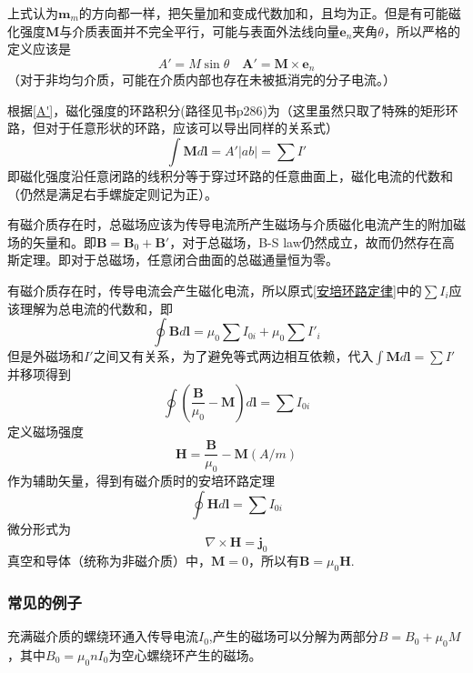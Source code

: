 上式认为$\bm{m}_m$的方向都一样，把矢量加和变成代数加和，且均为正。但是有可能磁化强度$\bm{M}$与介质表面并不完全平行，可能与表面外法线向量$\bm{e}_n$夹角$\theta$，所以严格的定义应该是
\begin{equation}
    A'=M\sin \theta \quad \bm{A}'=\bm{M}\times \bm{e}_n
\end{equation}
（对于非均匀介质，可能在介质内部也存在未被抵消完的分子电流。）

根据\ref{A'}，磁化强度的环路积分(路径见书p286)为（这里虽然只取了特殊的矩形环路，但对于任意形状的环路，应该可以导出同样的关系式）
\begin{equation}
    \int \bm{M}d\bm{l}=A'|ab|=\sum I'
\end{equation}
即磁化强度沿任意闭路的线积分等于穿过环路的任意曲面上，磁化电流的代数和（仍然是满足右手螺旋定则记为正）。

有磁介质存在时，总磁场应该为传导电流所产生磁场与介质磁化电流产生的附加磁场的矢量和。即$\bm{B}=\bm{B}_0+\bm{B}'$，对于总磁场，B-S law仍然成立，故而仍然存在高斯定理。即对于总磁场，任意闭合曲面的总磁通量恒为零。

有磁介质存在时，传导电流会产生磁化电流，所以原式\ref{安培环路定律}中的$\sum I_i$应该理解为总电流的代数和，即
\begin{equation}
    \oint \bm{B}d\bm{l}=\mu_0\sum I_{0i}+\mu_0\sum I'_i
\end{equation}
但是外磁场和$I'$之间又有关系，为了避免等式两边相互依赖，代入$\int \bm{M}d\bm{l}=\sum I'$并移项得到
\begin{equation}
    \oint (\dfrac{\bm{B}}{\mu_0}-\bm{M})d\bm{l}=\sum I_{0i}
\end{equation}
定义磁场强度
\begin{equation}
    \bm{H}=\dfrac{\bm{B}}{\mu_0}-\bm{M}(A/m)
\end{equation}
作为辅助矢量，得到有磁介质时的安培环路定理
\begin{equation}
    \oint \bm{H}d\bm{l}=\sum I_{0i}
\end{equation}
微分形式为
\begin{equation}
    \nabla \times \bm{H}=\bm{j}_0
\end{equation}
真空和导体（统称为非磁介质）中，$\bm{M}=0$，所以有$\bm{B}=\mu_0\bm{H}$.
\subsubsection{常见的例子}
充满磁介质的螺绕环通入传导电流$I_0$,产生的磁场可以分解为两部分$B=B_0+\mu_0 M$，其中$B_0=\mu_0 n I_0$为空心螺绕环产生的磁场。

